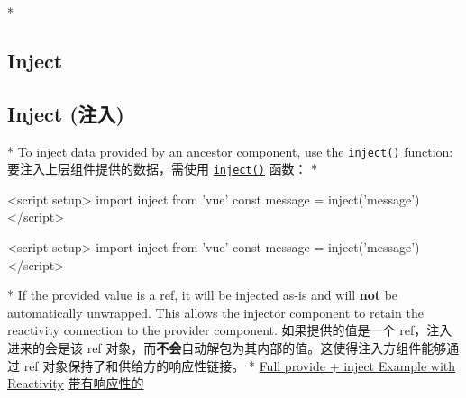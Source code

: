 \begin{paracol}{2}
 
\switchcolumn[0]*%
\subsection{Inject}
\switchcolumn
\subsection{Inject (注入)}
\switchcolumn[0]*%
To inject data provided by an ancestor component, use the
\href{https://vuejs.org/api/composition-api-dependency-injection.html\#inject}{\texttt{inject()}}
function:
\switchcolumn
要注入上层组件提供的数据，需使用
\href{https://cn.vuejs.org/api/composition-api-dependency-injection.html\#inject}{\texttt{inject()}}
函数：
\switchcolumn[0]*%
\begin{codeHtml}
<script setup>
import { inject } from 'vue'
const message = inject('message')
</script>
\end{codeHtml}
\switchcolumn
\begin{codeHtml}
<script setup>
import { inject } from 'vue'
const message = inject('message')
</script>
\end{codeHtml}
\switchcolumn[0]*%
If the provided value is a ref, it will be injected as-is and will
\textbf{not} be automatically unwrapped. This allows the injector
component to retain the reactivity connection to the provider component.
\switchcolumn
如果提供的值是一个 ref，注入进来的会是该 ref
对象，而\textbf{不会}自动解包为其内部的值。这使得注入方组件能够通过 ref
对象保持了和供给方的响应性链接。
\switchcolumn[0]*%
\href{https://play.vuejs.org/\#eNqFUUFugzAQ/MrKF1IpxfeIVKp66Kk/8MWFDXYFtmUbpArx967BhURRU9/WOzO7MzuxV+fKcUB2YlWovXYRAsbBvQije2d9hAk8Xo7gvB11gzDDxdseCuIUG+ZN6a7JjZIvVRIlgDCcw+d3pmvTglz1okJ499I0C3qB1dJQT9YRooVaSdNiACWdQ5OICj2WwtTWhAg9hiBbhHNSOxQKu84WT8LkNQ9FBhTHXyg1K75aJHNUROxdJyNSBVBp44YI43NvG+zOgmWWYGt7dcipqPhGZEe2ef07wN3lltD+lWN6tNkV/37+rdKjK2rzhRTt7f3u41xhe37/xJZGAL2PLECXa9NKdD/a6QTTtGnP88LgiXJtYv4BaLHhvg==}{Full
provide + inject Example with Reactivity}
\switchcolumn
\href{https://play.vuejs.org/\#eNqFUUFugzAQ/MrKF1IpxfeIVKp66Kk/8MWFDXYFtmUbpArx967BhURRU9/WOzO7MzuxV+fKcUB2YlWovXYRAsbBvQije2d9hAk8Xo7gvB11gzDDxdseCuIUG+ZN6a7JjZIvVRIlgDCcw+d3pmvTglz1okJ499I0C3qB1dJQT9YRooVaSdNiACWdQ5OICj2WwtTWhAg9hiBbhHNSOxQKu84WT8LkNQ9FBhTHXyg1K75aJHNUROxdJyNSBVBp44YI43NvG+zOgmWWYGt7dcipqPhGZEe2ef07wN3lltD+lWN6tNkV/37+rdKjK2rzhRTt7f3u41xhe37/xJZGAL2PLECXa9NKdD/a6QTTtGnP88LgiXJtYv4BaLHhvg==}{带有响应性的
}
\end{paracol}
